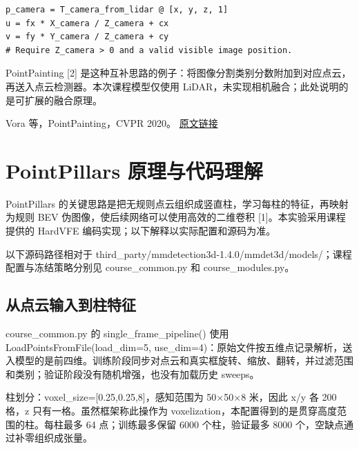 \documentclass[UTF8,zihao=-4,fontset=windows]{ctexart}
\begin{document}
\begin{lstlisting}[caption={投影关系的简化表达：还需处理畸变、遮挡和不同采集时刻的车辆运动。}]
p_camera = T_camera_from_lidar @ [x, y, z, 1]
u = fx * X_camera / Z_camera + cx
v = fy * Y_camera / Z_camera + cy
# Require Z_camera > 0 and a valid visible image position.
\end{lstlisting}

{\small PointPainting [2] 是这种互补思路的例子：将图像分割类别分数附加到对应点云，再送入点云检测器。本次课程模型仅使用 LiDAR，未实现相机融合；此处说明的是可扩展的融合原理。\par}

{\small\noindent [2] Vora 等，PointPainting，CVPR 2020。 \href{https://arxiv.org/abs/1911.10150}{原文链接}\par}


\FloatBarrier

\section{PointPillars 原理与代码理解}

PointPillars 的关键思路是把无规则点云组织成竖直柱，学习每柱的特征，再映射为规则 BEV 伪图像，使后续网络可以使用高效的二维卷积 [1]。本实验采用课程提供的 HardVFE 编码实现；以下解释以实际配置和源码为准。


以下源码路径相对于 third\_party/\allowbreak{}mmdetection3d-1.4.0/\allowbreak{}mmdet3d/\allowbreak{}models/\allowbreak{}；课程配置与冻结策略分别见 course\_common.py 和 course\_modules.py。


\subsection{从点云输入到柱特征}

course\_common.py 的 single\_frame\_pipeline() 使用 LoadPointsFromFile(load\_dim=5, use\_dim=4)：原始文件按五维点记录解析，送入模型的是前四维。训练阶段同步对点云和真实框旋转、缩放、翻转，并过滤范围和类别；验证阶段没有随机增强，也没有加载历史 sweeps。


柱划分：voxel\_size=[0.25,0.25,8]，感知范围为 50×50×8 米，因此 x/\allowbreak{}y 各 200 格，z 只有一格。虽然框架称此操作为 voxelization，本配置得到的是贯穿高度范围的柱。每柱最多 64 点；训练最多保留 6000 个柱，验证最多 8000 个，空缺点通过补零组织成张量。
\end{document}
